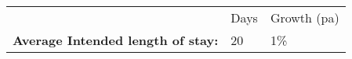 \begin{tabular}[t]{p{5cm}p{1.3cm}p{1.2cm}}
   & Days & Growth (pa) \\ 
 \textbf{Average Intended length of stay:} & 20 & 1\% \\ 
  \end{tabular}
